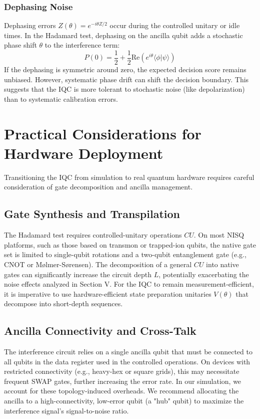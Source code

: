 \documentclass[conference]{IEEEtran}
\begin{document}
\subsubsection{Dephasing Noise}
Dephasing errors $Z(\theta) = e^{-i\theta Z/2}$ occur during the controlled unitary or idle times. In the Hadamard test, dephasing on the ancilla qubit adds a stochastic phase shift $\theta$ to the interference term:
\begin{equation}
    P(0) = \frac{1}{2} + \frac{1}{2} \text{Re}(e^{i\theta} \langle \phi | \psi \rangle)
\end{equation}
If the dephasing is symmetric around zero, the expected decision score remains unbiased. However, systematic phase drift can shift the decision boundary. This suggests that the IQC is more tolerant to stochastic noise (like depolarization) than to systematic calibration errors.

\section{Practical Considerations for Hardware Deployment}

Transitioning the IQC from simulation to real quantum hardware requires careful consideration of gate decomposition and ancilla management.

\subsection{Gate Synthesis and Transpilation}

The Hadamard test requires controlled-unitary operations $CU$. On most NISQ platforms, such as those based on transmon or trapped-ion qubits, the native gate set is limited to single-qubit rotations and a two-qubit entanglement gate (e.g., CNOT or Mølmer-Sørensen). The decomposition of a general $CU$ into native gates can significantly increase the circuit depth $L$, potentially exacerbating the noise effects analyzed in Section V. For the IQC to remain measurement-efficient, it is imperative to use hardware-efficient state preparation unitaries $V(\theta)$ that decompose into short-depth sequences.

\subsection{Ancilla Connectivity and Cross-Talk}

The interference circuit relies on a single ancilla qubit that must be connected to all qubits in the data register used in the controlled operations. On devices with restricted connectivity (e.g., heavy-hex or square grids), this may necessitate frequent SWAP gates, further increasing the error rate. In our simulation, we account for these topology-induced overheads. We recommend allocating the ancilla to a high-connectivity, low-error qubit (a "hub" qubit) to maximize the interference signal's signal-to-noise ratio.
\end{document}
